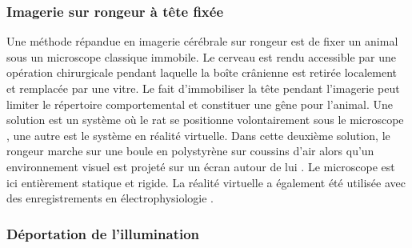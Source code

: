 
\subsubsection{Imagerie sur rongeur à tête fixée}

Une méthode répandue en imagerie cérébrale sur rongeur est de fixer un animal sous un microscope classique immobile. Le cerveau est rendu accessible par une opération chirurgicale pendant laquelle la boîte crânienne est retirée localement et remplacée par une vitre. Le fait d'immobiliser la tête pendant l'imagerie peut limiter le répertoire comportemental et constituer une gêne pour l'animal. Une solution est un système où le rat se positionne volontairement sous le microscope \cite{scott_cellular_2013}, une autre est le système en réalité virtuelle. Dans cette deuxième solution, le rongeur marche sur une boule en polystyrène sur coussins d'air alors qu'un environnement visuel est projeté sur un écran autour de lui \cite{dombeck_functional_2010}. Le microscope est ici entièrement statique et rigide. La réalité virtuelle a également été utilisée avec des enregistrements en électrophysiologie \cite{aronov_engagement_2014}\cite{whitlock_navigating_2014}.




\subsubsection{Déportation de l'illumination}


